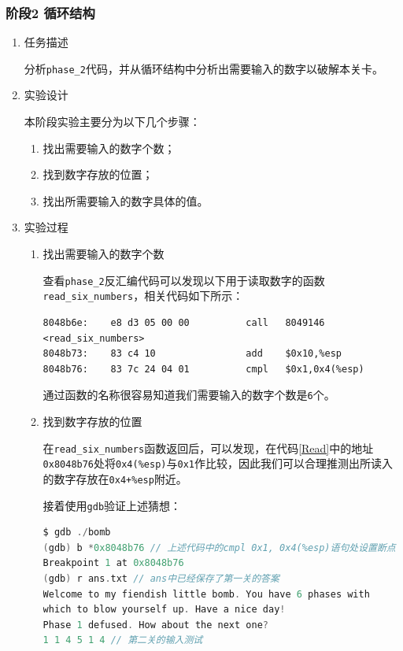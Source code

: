 \documentclass{paper}
\begin{document}
\subsubsection{阶段2 循环结构}
\begin{enumerate}
\item 任务描述

分析\verb|phase_2|代码，并从循环结构中分析出需要输入的数字以破解本关卡。

\item 实验设计

本阶段实验主要分为以下几个步骤：

\begin{enumerate}
\item 找出需要输入的数字个数；
\item 找到数字存放的位置；
\item 找出所需要输入的数字具体的值。 
\end{enumerate}

\item 实验过程

\begin{enumerate}
\item 找出需要输入的数字个数

查看\verb|phase_2|反汇编代码可以发现以下用于读取数字的函数\verb|read_six_numbers|，相关代码如下所示：

\begin{lstlisting}[label={Read},caption={Read}]
8048b6e:	e8 d3 05 00 00       	call   8049146 <read_six_numbers>
8048b73:	83 c4 10             	add    $0x10,%esp
8048b76:	83 7c 24 04 01       	cmpl   $0x1,0x4(%esp)
\end{lstlisting}

通过函数的名称很容易知道我们需要输入的数字个数是\verb|6|个。

\item 找到数字存放的位置

在\verb|read_six_numbers|函数返回后，可以发现，在代码\ref{Read}中的地址\verb|0x8048b76|处将\verb|0x4(%esp)|与\verb|0x1|作比较，因此我们可以合理推测出所读入的数字存放在\verb|0x4+%esp|附近。

接着使用\verb|gdb|验证上述猜想：

\begin{lstlisting}[language=C]
$ gdb ./bomb
(gdb) b *0x8048b76 // 上述代码中的cmpl 0x1, 0x4(%esp)语句处设置断点
Breakpoint 1 at 0x8048b76
(gdb) r ans.txt // ans中已经保存了第一关的答案
Welcome to my fiendish little bomb. You have 6 phases with
which to blow yourself up. Have a nice day!
Phase 1 defused. How about the next one?
1 1 4 5 1 4 // 第二关的输入测试


\end{lstlisting}
\end{enumerate}
\end{enumerate}
\end{document}

